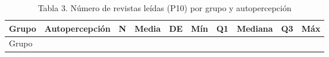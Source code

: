 \documentclass[
  spanish,
  12pt,
]{extarticle}
\begin{document}
\begin{longtable}[]{@{}
  >{\raggedright\arraybackslash}p{}
  >{\raggedright\arraybackslash}p{}
  >{\raggedleft\arraybackslash}p{}
  >{\raggedleft\arraybackslash}p{}
  >{\raggedleft\arraybackslash}p{}
  >{\raggedleft\arraybackslash}p{}
  >{\raggedleft\arraybackslash}p{}
  >{\raggedleft\arraybackslash}p{}
  >{\raggedleft\arraybackslash}p{}
  >{\raggedleft\arraybackslash}p{}@{}}
\caption{Tabla 3. Número de revistas leídas (P10) por grupo y
autopercepción}\tabularnewline
\toprule\noalign{}
\begin{minipage}[b]{\linewidth}\raggedright
Grupo
\end{minipage} & \begin{minipage}[b]{\linewidth}\raggedright
Autopercepción
\end{minipage} & \begin{minipage}[b]{\linewidth}\raggedleft
N
\end{minipage} & \begin{minipage}[b]{\linewidth}\raggedleft
Media
\end{minipage} & \begin{minipage}[b]{\linewidth}\raggedleft
DE
\end{minipage} & \begin{minipage}[b]{\linewidth}\raggedleft
Mín
\end{minipage} & \begin{minipage}[b]{\linewidth}\raggedleft
Q1
\end{minipage} & \begin{minipage}[b]{\linewidth}\raggedleft
Mediana
\end{minipage} & \begin{minipage}[b]{\linewidth}\raggedleft
Q3
\end{minipage} & \begin{minipage}[b]{\linewidth}\raggedleft
Máx
\end{minipage} \\
\midrule\noalign{}
\endfirsthead
\toprule\noalign{}
\begin{minipage}[b]{\linewidth}\raggedright
Grupo

\end{minipage}
\end{longtable}
\end{document}
